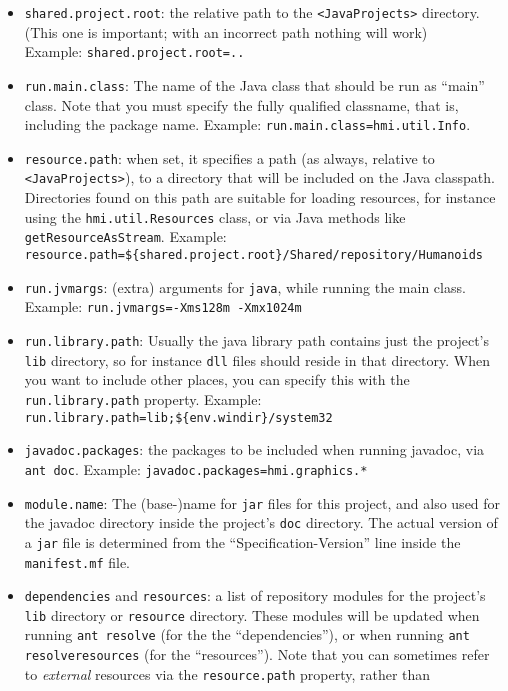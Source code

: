 \begin{itemize}
\item \verb"shared.project.root": the relative path to the \verb"<JavaProjects>" directory.
(This one is important; with an incorrect path nothing will work)\\
Example: \verb"shared.project.root=.."
\item \verb"run.main.class": The name of the Java class that should be run as ``main'' class.
Note that you must specify the fully qualified classname, that is, including the package name.
Example: \verb"run.main.class=hmi.util.Info".
\item \verb"resource.path": when set, it specifies a path (as always, relative to \verb"<JavaProjects>"),
to a directory that will be included on the Java classpath. Directories found on this path are suitable
for loading resources, for instance using the \verb"hmi.util.Resources" class, or via
Java methods like \verb"getResourceAsStream".
Example:\\
\verb"resource.path=${shared.project.root}/Shared/repository/Humanoids"
\item \verb"run.jvmargs":  (extra) arguments for \verb"java", while running the main class.
Example: \verb"run.jvmargs=-Xms128m -Xmx1024m"
\item \verb"run.library.path": Usually the java library path contains just the project's \verb"lib" directory,
so for instance \verb"dll" files should reside in that directory.
When you want to include other places, you can specify this with the \verb"run.library.path" property.
Example:\\ \verb"run.library.path=lib;${env.windir}/system32"
\item \verb"javadoc.packages": the packages to be included when running javadoc,
via \verb"ant doc". Example: \verb"javadoc.packages=hmi.graphics.*"
\item \verb"module.name": The (base-)name for \verb"jar" files for this project, and also used for the javadoc directory inside the project's \verb"doc" directory.
The actual version of a \verb"jar" file is determined from the ``Specification-Version'' line inside
the \verb"manifest.mf" file.
\item \verb"dependencies" and \verb"resources": a list of repository modules for the project's \verb"lib" directory
or \verb"resource" directory.
These modules will be updated when running \verb"ant resolve" (for the the ``dependencies''), or
when running \verb"ant resolveresources" (for the ``resources'').
Note that you can sometimes refer to \emph{external} resources via the \verb"resource.path" property, rather than

\end{itemize}
